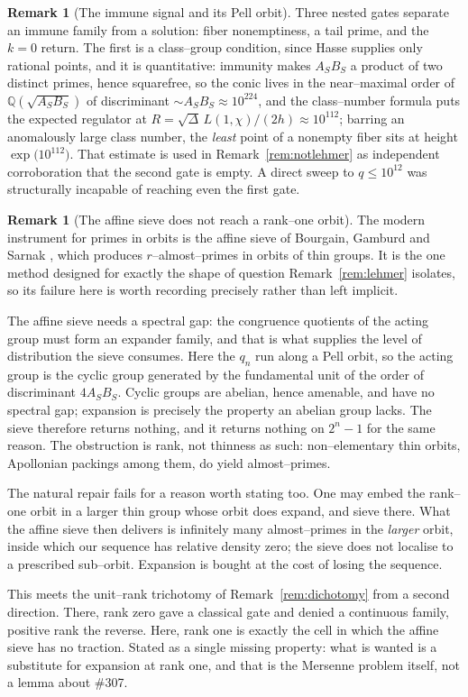 \documentclass[11pt]{article}
\theoremstyle{definition}
\newtheorem{remark}[theorem]{Remark}
\begin{document}
\begin{remark}[The immune signal and its Pell orbit]
Three nested gates separate an immune family from a solution: fiber nonemptiness, a tail prime, and
the $k=0$ return. The first is a class--group condition, since Hasse supplies only rational points,
and it is quantitative: immunity makes $A_SB_S$ a product of two distinct primes, hence squarefree,
so the conic lives in the near--maximal order of $\mathbb{Q}(\sqrt{A_SB_S})$ of discriminant
${\sim}A_SB_S\approx10^{224}$, and the class--number formula puts the expected regulator at
$R=\sqrt\Delta\,L(1,\chi)/(2h)\approx10^{112}$; barring an anomalously large class number, the
\emph{least} point of a nonempty fiber sits at height $\exp\bigl(10^{112}\bigr)$. That estimate is
used in Remark~\ref{rem:notlehmer} as independent corroboration that the second gate is empty. A
direct sweep to $q\le10^{12}$ was structurally incapable of reaching even the first gate.
\end{remark}

\begin{remark}[The affine sieve does not reach a rank--one orbit]\label{rem:affinesieve}
The modern instrument for primes in orbits is the affine sieve of Bourgain, Gamburd and Sarnak
\cite{BGS2010}, which produces $r$--almost--primes in orbits of thin groups. It is the one method
designed for exactly the shape of question Remark~\ref{rem:lehmer} isolates, so its failure here is
worth recording precisely rather than left implicit.

The affine sieve needs a spectral gap: the congruence quotients of the acting group must form an
expander family, and that is what supplies the level of distribution the sieve consumes. Here the
$q_n$ run along a Pell orbit, so the acting group is the cyclic group generated by the fundamental
unit of the order of discriminant $4A_SB_S$. Cyclic groups are abelian, hence amenable, and have no
spectral gap; expansion is precisely the property an abelian group lacks. The sieve therefore
returns nothing, and it returns nothing on $2^n-1$ for the same reason. The obstruction is rank, not
thinness as such: non--elementary thin orbits, Apollonian packings among them, do yield
almost--primes.

The natural repair fails for a reason worth stating too. One may embed the rank--one orbit in a
larger thin group whose orbit does expand, and sieve there. What the affine sieve then delivers is
infinitely many almost--primes in the \emph{larger} orbit, inside which our sequence has relative
density zero; the sieve does not localise to a prescribed sub--orbit. Expansion is bought at the
cost of losing the sequence.

This meets the unit--rank trichotomy of Remark~\ref{rem:dichotomy} from a second direction. There,
rank zero gave a classical gate and denied a continuous family, positive rank the reverse. Here,
rank one is exactly the cell in which the affine sieve has no traction. Stated as a single missing
property: what is wanted is a substitute for expansion at rank one, and that is the Mersenne problem
itself, not a lemma about \#307.
\end{remark}
\end{document}
